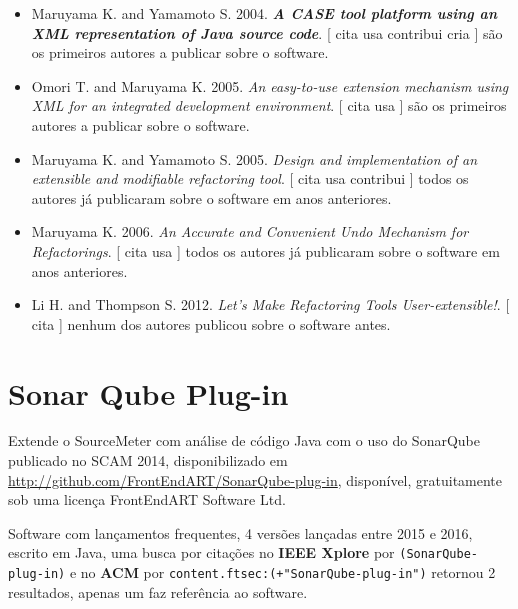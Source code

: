 \begin{itemize}
\item Maruyama K. and Yamamoto S.
      2004.
        \textbf{\textit{ A CASE tool platform using an XML representation of Java source code}}.
      [
          cita
          usa
          contribui
          cria
      ]
são os primeiros autores a publicar sobre o software.
\item Omori T. and Maruyama K.
      2005.
        \textit{ An easy-to-use extension mechanism using XML for an integrated development environment}.
      [
          cita
          usa
      ]
são os primeiros autores a publicar sobre o software.
\item Maruyama K. and Yamamoto S.
      2005.
        \textit{ Design and implementation of an extensible and modifiable refactoring tool}.
      [
          cita
          usa
          contribui
      ]
todos os autores já publicaram sobre o software em anos anteriores.
\item Maruyama K.
      2006.
        \textit{ An Accurate and Convenient Undo Mechanism for Refactorings}.
      [
          cita
          usa
      ]
todos os autores já publicaram sobre o software em anos anteriores.
\item Li H. and Thompson S.
      2012.
        \textit{ Let's Make Refactoring Tools User-extensible!}.
      [
          cita
      ]
nenhum dos autores publicou sobre o software antes.
\end{itemize}
\section{Sonar Qube Plug-in}

Extende o SourceMeter com análise de código Java com o uso do SonarQube
publicado no SCAM 2014,
disponibilizado em \url{http://github.com/FrontEndART/SonarQube-plug-in},
disponível,
gratuitamente
sob uma licença FrontEndART Software Ltd.

Software com lançamentos frequentes,
4 versões lançadas
entre 2015 e 2016,
escrito em Java,
uma busca por citações no {\bf IEEE Xplore} por
\texttt{(SonarQube-plug-in)}
e no {\bf ACM} por
\texttt{content.ftsec:(+"SonarQube-plug-in")}
retornou
2 resultados,
apenas um faz referência ao software.



